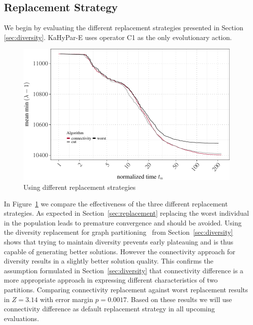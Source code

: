 \documentclass[a4paper,12pt,titlepage, BCOR7mm,headsepline]{scrbook}
\numberwithin{equation}{section}
\begin{document}
\subsection{Replacement Strategy}
We begin by evaluating the different replacement strategies presented in Section \ref{sec:diversity}. KaHyPar-E uses operator C1 as the only evolutionary action.
\begin{figure}[H]


\begin{center}
\includegraphics{rnw/tuning_subset_plots/replace_plot-1}\caption{Using different replacement strategies}\label{fig:replacement}
\end{center}

\end{figure}
In Figure~\ref{fig:replacement} we compare the effectiveness of the three different replacement strategies. As expected in Section~\ref{sec:replacement} replacing the worst individual in the population leads to premature convergence and should be avoided. Using the diversity replacement for graph partitioning~\cite{sanders2012distributed} from Section~\ref{sec:diversity} shows that trying to maintain diversity prevents early plateauing and is thus capable of generating better solutions. However the connectivity approach for diversity results in a slightly better solution quality. This confirms the assumption formulated in Section~\ref{sec:diversity} that connectivity difference is a more appropriate approach in expressing different characteristics of two partitions. Comparing connectivity replacement against worst replacement results in $Z = 3.14$ with error margin $p = 0.0017$. Based on these results we will use connectivity difference as default replacement strategy in all upcoming evaluations.
\end{document}
